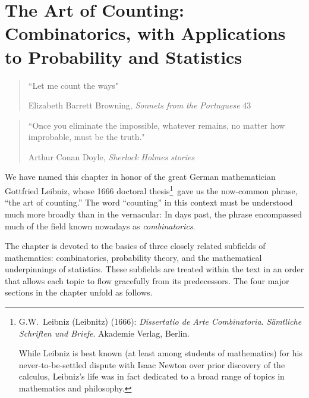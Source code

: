 
\chapter{The Art of Counting:
Combinatorics, with Applications to Probability and Statistics}
\label{ch:prob-stat}
\label{ch:combinatorics}

\begin{quote}
``Let me count the ways"

\hspace*{.75in}Elizabeth Barrett Browning, {\it Sonnets from the Portuguese} 43
\end{quote}

\bigskip

\begin{quote}
``Once you eliminate the impossible, whatever remains, no matter how
  improbable, must be the truth."

\hspace*{.75in}Arthur Conan Doyle, {\it Sherlock Holmes stories}
\end{quote}

\bigskip

 

\noindent
We have named this chapter in honor of the great German mathematician Gottfried Leibniz, whose 1666 doctoral thesis\footnote{G.W.~Leibniz (Leibnitz) (1666):  {\it Dissertatio de Arte Combinatoria}.  {\it S\"{a}mtliche Schriften und Briefe}.  Akademie Verlag, Berlin.

While Leibniz is best known (at least among students of mathematics) for his never-to-be-settled dispute with Isaac Newton over prior discovery of the calculus, Leibniz's life was in fact dedicated to a broad range of topics in mathematics and philosophy.}~gave us the now-common phrase, ``the art of counting.''  The word ``counting'' in this context must be understood much more broadly than in the vernacular: In days past, the phrase encompassed much of the field known nowadays as {\it combinatorics}. 

\medskip

The chapter is devoted to the basics of three closely related subfields of mathematics: combinatorics, probability theory, and the mathematical underpinnings of statistics.  These subfields are treated within the text in an order that allows each topic to flow gracefully from its predecessors.  The four major sections in the chapter unfold as follows.

